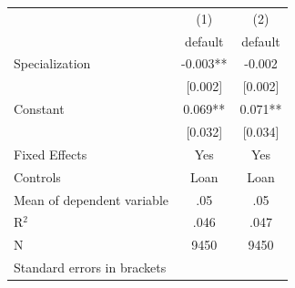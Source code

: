 {
\begin{tabular}{l*{2}{c}}
\toprule
                              &\multicolumn{1}{c}{(1)}&\multicolumn{1}{c}{(2)}\\
                              &\multicolumn{1}{c}{default}&\multicolumn{1}{c}{default}\\
\midrule
Specialization                &      -0.003** &      -0.002   \\
                              &     [0.002]   &     [0.002]   \\
[1em]
Constant                      &       0.069** &       0.071** \\
                              &     [0.032]   &     [0.034]   \\
\toprule
Fixed Effects                 &         Yes   &         Yes   \\
Controls                      &        Loan   &        Loan   \\
Mean of dependent variable    &         .05   &         .05   \\
 R$^2$                        &        .046   &        .047   \\
N                             &        9450   &        9450   \\
\bottomrule
\multicolumn{3}{l}{\footnotesize Standard errors in brackets}\\
\end{tabular}
}
